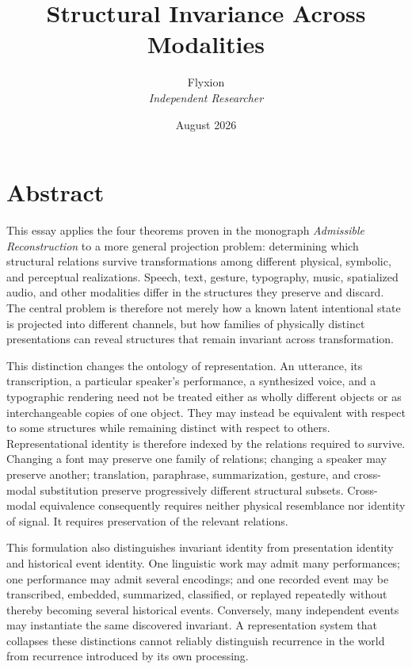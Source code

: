 \documentclass[11pt]{book}
\title{\textbf{Structural Invariance Across Modalities}}
\author{Flyxion \\ \textit{Independent Researcher}}
\date{August 2026}
\begin{document}
\frontmatter

\maketitle

\chapter*{Abstract}

This essay applies the four theorems proven in the monograph
\emph{Admissible Reconstruction} to a more general projection problem:
determining which structural relations survive transformations among
different physical, symbolic, and perceptual realizations. Speech, text,
gesture, typography, music, spatialized audio, and other modalities differ
in the structures they preserve and discard. The central problem is
therefore not merely how a known latent intentional state is projected
into different channels, but how families of physically distinct
presentations can reveal structures that remain invariant across
transformation.

This distinction changes the ontology of representation. An utterance,
its transcription, a particular speaker's performance, a synthesized
voice, and a typographic rendering need not be treated either as wholly
different objects or as interchangeable copies of one object. They may
instead be equivalent with respect to some structures while remaining
distinct with respect to others. Representational identity is therefore
indexed by the relations required to survive. Changing a font may preserve
one family of relations; changing a speaker may preserve another;
translation, paraphrase, summarization, gesture, and cross-modal
substitution preserve progressively different structural subsets.
Cross-modal equivalence consequently requires neither physical resemblance
nor identity of signal. It requires preservation of the relevant
relations.

This formulation also distinguishes invariant identity from presentation
identity and historical event identity. One linguistic work may admit
many performances; one performance may admit several encodings; and one
recorded event may be transcribed, embedded, summarized, classified, or
replayed repeatedly without thereby becoming several historical events.
Conversely, many independent events may instantiate the same discovered
invariant. A representation system that collapses these distinctions
cannot reliably distinguish recurrence in the world from recurrence
introduced by its own processing.
\end{document}
